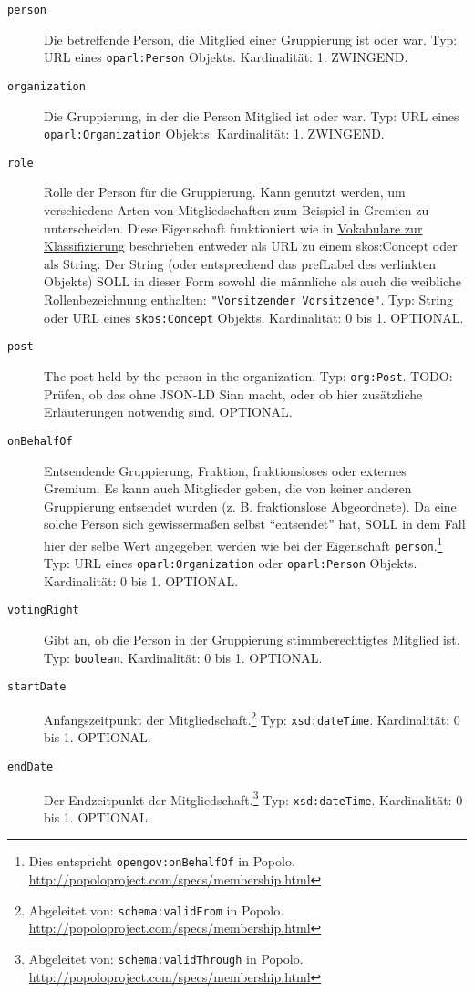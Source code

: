 \documentclass[,a4paper]{article}
\begin{document}
\begin{description}
\item[\texttt{person}]
Die betreffende Person, die Mitglied einer Gruppierung ist oder war.
Typ: URL eines \texttt{oparl:Person} Objekts. Kardinalität: 1. ZWINGEND.
\item[\texttt{organization}]
Die Gruppierung, in der die Person Mitglied ist oder war. Typ: URL eines
\texttt{oparl:Organization} Objekts. Kardinalität: 1. ZWINGEND.
\item[\texttt{role}]
Rolle der Person für die Gruppierung. Kann genutzt werden, um
verschiedene Arten von Mitgliedschaften zum Beispiel in Gremien zu
unterscheiden. Diese Eigenschaft funktioniert wie in
\hyperref[vokabulareux5fklassifizierung]{Vokabulare zur Klassifizierung}
beschrieben entweder als URL zu einem skos:Concept oder als String. Der
String (oder entsprechend das prefLabel des verlinkten Objekts) SOLL in
dieser Form sowohl die männliche als auch die weibliche
Rollenbezeichnung enthalten:
\texttt{"Vorsitzender \textbar{} Vorsitzende"}. Typ: String oder URL
eines \texttt{skos:Concept} Objekts. Kardinalität: 0 bis 1. OPTIONAL.
\item[\texttt{post}]
The post held by the person in the organization. Typ: \texttt{org:Post}.
TODO: Prüfen, ob das ohne JSON-LD Sinn macht, oder ob hier zusätzliche
Erläuterungen notwendig sind. OPTIONAL.
\item[\texttt{onBehalfOf}]
Entsendende Gruppierung, Fraktion, fraktionsloses oder externes Gremium.
Es kann auch Mitglieder geben, die von keiner anderen Gruppierung
entsendet wurden (z. B. fraktionslose Abgeordnete). Da eine solche
Person sich gewissermaßen selbst ``entsendet'' hat, SOLL in dem Fall
hier der selbe Wert angegeben werden wie bei der Eigenschaft
\texttt{person}.\footnote{Dies entspricht \texttt{opengov:onBehalfOf} in
  Popolo. \url{http://popoloproject.com/specs/membership.html}} Typ: URL
eines \texttt{oparl:Organization} oder \texttt{oparl:Person} Objekts.
Kardinalität: 0 bis 1. OPTIONAL.
\item[\texttt{votingRight}]
Gibt an, ob die Person in der Gruppierung stimmberechtigtes Mitglied
ist. Typ: \texttt{boolean}. Kardinalität: 0 bis 1. OPTIONAL.
\item[\texttt{startDate}]
Anfangszeitpunkt der Mitgliedschaft.\footnote{Abgeleitet von:
  \texttt{schema:validFrom} in Popolo.
  \url{http://popoloproject.com/specs/membership.html}} Typ:
\texttt{xsd:dateTime}. Kardinalität: 0 bis 1. OPTIONAL.
\item[\texttt{endDate}]
Der Endzeitpunkt der Mitgliedschaft.\footnote{Abgeleitet von:
  \texttt{schema:validThrough} in Popolo.
  \url{http://popoloproject.com/specs/membership.html}} Typ:
\texttt{xsd:dateTime}. Kardinalität: 0 bis 1. OPTIONAL.
\end{description}
\end{document}
